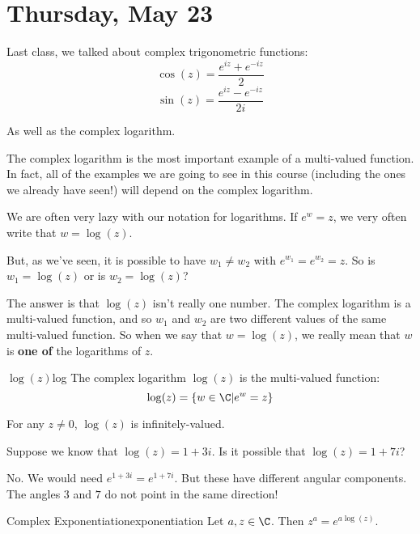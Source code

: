 \section{Thursday, May 23}


Last class, we talked about complex trigonometric functions:
$$\cos(z) = \frac{e^{iz} + e^{-iz}}{2}$$
$$\sin(z) = \frac{e^{iz} - e^{-iz}}{2i}$$

As well as the complex logarithm.

The complex logarithm is the most important example of a multi-valued function. In fact, all of the examples we are going to see in this course (including the ones we already have seen!) will depend on the complex logarithm.

\begin{notation} We are often very lazy with our notation for logarithms. If $e^w = z$, we very often write that $w = \log(z)$.

But, as we've seen, it is possible to have $w_1\ne w_2$ with $e^{w_1} = e^{w_2} = z$. So is $w_1 = \log(z)$ or is $w_2 = \log(z)$?

The answer is that $\log(z)$ isn't really one number. The complex logarithm is a multi-valued function, and so $w_1$ and $w_2$ are two different values of the same multi-valued function. So when we say that $w = \log(z)$, we really mean that $w$ is {\bf one of} the logarithms of $z$.
\end{notation}

\begin{defbo}{$\log(z)$}{log}
The complex logarithm $\log(z)$ is the multi-valued function:
$$\log(z) = \{w\in \C| e^w = z\}$$

For any $z\ne 0$, $\log(z)$ is infinitely-valued.
\end{defbo}


\begin{ex}{}{} Suppose we know that $\log(z) = 1 + 3i$. Is it possible that $\log(z) = 1 + 7i$?

No. We would need $e^{1 + 3i} = e^{1 + 7i}$. But these have different angular components. The angles $3$ and $7$ do not point in the same direction!
\end{ex}



\begin{defbo}{Complex Exponentiation}{exponentiation} 
Let $a,z\in \C$. Then $z^a = e^{a\log(z)}$.
\end{defbo}


